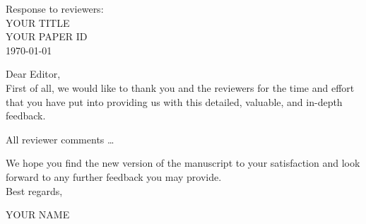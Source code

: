 \documentclass[a4paper,11pt, parskip=half]{scrartcl}
\newcommand{\paperId}{YOUR PAPER ID}
\newcommand{\paperTitle}{YOUR TITLE}
\begin{document}
\thispagestyle{plain}

\begin{center}
Response to reviewers: \\[1em]

 {\Large \paperTitle} \vspace{0.5cm} \\
 {\paperId{}} \vspace{0.5cm} \\
 \today \vspace{0.5cm} \\
\end{center}


Dear Editor, \\

First of all, we would like to thank you and the reviewers for the time and effort that you have put into providing us with this detailed, valuable, and in-depth feedback.

All reviewer comments …

We hope you find the new version of the manuscript to your satisfaction and look forward to any further feedback you may provide.
\\[3em]
Best regards,

YOUR NAME

\newpage


% 
% 
\end{document}
